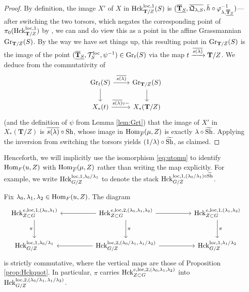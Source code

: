 \begin{proof}
By definition, the image $X'$ of $X$ in $\mathrm{Hck}_{\mathbf{T}/Z}^{\mathrm{loc},1}(S)$ is $(\underline{\overline{\mathbf{T}}_{S}},\overline{\mathfrak{Q}_{\lambda,S}},\bar{h} \circ \varphi_{\lambda,\underline{\overline{\mathbf{T}}_{S}}}^{-1})$---after switching the two torsors, which negates the corresponding point of $\pi_{0}(\mathrm{Hck}_{\mathbf{T}/Z}^{\mathrm{loc},1})$ by \cite[\S I.6]{Geometrization}, we can and do view this as a point in the affine Grassmannian $\textnormal{Gr}_{\mathbf{T}/Z}(S)$. By the way we have set things up, this resulting point in $\textnormal{Gr}_{\mathbf{T}/Z}(S)$ is the image of the point $(\underline{\overline{\mathbf{T}}_{S}},\mathcal{T}_{S}^{\mathrm{loc}},\psi^{-1}) \in \textnormal{Gr}_{t}(S)$ via the map $t \xrightarrow{\overline{s(\lambda)}} \mathbf{T}/Z$. We deduce from the commutativity of  
\[
\begin{tikzcd}
\tn{Gr}_{t}(S) \arrow{d} \arrow["\ov{s(\lambda)}"]{r} & \tn{Gr}_{\mathbf{T}/Z}(S) \arrow{d} \\
X_{*}(t) \arrow["\ov{s(\lambda)} \circ -"]{r} & X_{*}(\mathbf{T}/Z)
\end{tikzcd}
\]
(and the definition of $\psi$ from Lemma \ref{lem:Grt}) that the image of $X'$ in $X_{*}(\mathbf{T}/Z)$ is $\overline{s(\lambda)} \circ \textnormal{Sh}$, whose image in $\mathrm{Hom}_{\overline{F}}(\mu,Z)$ is exactly $\lambda \circ \widetilde{\textnormal{Sh}}$. Applying the inversion from switching the torsors yields $(1/\lambda) \circ \widetilde{\textnormal{Sh}}$, as claimed.
\end{proof}

Henceforth, we will implicitly use the isomorphism \eqref{eq:utomu} to identify $\mathrm{Hom}_{F}(u,Z)$ with $\mathrm{Hom}_{\overline{F}}(\mu,Z)$ rather than writing the map explicitly. For example, we write $\mathrm{Hck}_{G/Z}^{\mathrm{loc},1,\lambda_{0}/\lambda_{1}}$ to denote the stack $\mathrm{Hck}_{G/Z}^{\mathrm{loc},1,(\lambda_{0}/\lambda_{1}) \circ \widetilde{\textnormal{Sh}}}$.

\begin{lem}\label{lem:outer-faces}
Fix $\lambda_0,\lambda_1,\lambda_2\in\mathrm{Hom}_F(u,Z)$. The diagram
\[
\begin{tikzcd}[column sep=huge, row sep=large]
\Hck^{e,\mathrm{loc},1,(\lambda_0,\lambda_1)}_{Z\subset G}
  \arrow[d,"\pi"']
& \Hck^{e,\mathrm{loc},2,(\lambda_0,\lambda_1,\lambda_2)}_{Z\subset G}
  \arrow[l]
  \arrow[r]
  \arrow[d,"\pi"]
& \Hck^{e,\mathrm{loc},1,(\lambda_1,\lambda_2)}_{Z\subset G}
  \arrow[d,"\pi"]
\\
\Hck^{\mathrm{loc},1,\lambda_0/\lambda_1}_{G/Z}
& \Hck^{\mathrm{loc},2,(\lambda_0/\lambda_1,\,\lambda_1/\lambda_2)}_{G/Z}
  \arrow[l]
  \arrow[r]
& \Hck^{\mathrm{loc},1,\lambda_1/\lambda_2}_{G/Z}
\end{tikzcd}
\]
is strictly commutative, where the vertical maps are those of Proposition \ref{prop:Hckquot}. In particular, $\pi$ carries $\mathrm{Hck}^{e,\mathrm{loc},2,(\lambda_0,\lambda_1,\lambda_2)}_{Z\subset G}$ into $\mathrm{Hck}^{\mathrm{loc},2,(\lambda_0/\lambda_1,\,\lambda_1/\lambda_2)}_{G/Z}$.
\end{lem}

